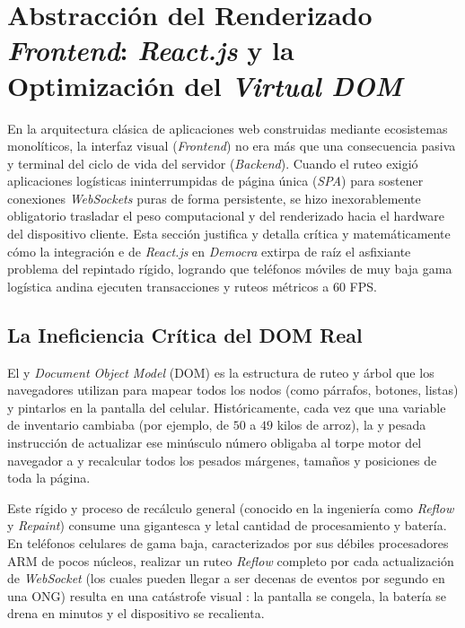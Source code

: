 \section{Abstracción del Renderizado \textit{Frontend}: \textit{React.js} y la Optimización del \textit{Virtual DOM}}

En la arquitectura clásica de aplicaciones web construidas mediante ecosistemas monolíticos, la interfaz visual (\textit{Frontend}) no era más que una consecuencia pasiva y terminal del ciclo de vida del servidor (\textit{Backend}). Cuando el ruteo exigió aplicaciones logísticas ininterrumpidas de página única (\textit{SPA}) para sostener conexiones \textit{WebSockets} puras de forma persistente, se hizo inexorablemente obligatorio trasladar el peso computacional y del renderizado hacia el hardware del dispositivo cliente. Esta sección justifica y detalla crítica y matemáticamente cómo la integración e de \textit{React.js} en \textit{Democra} extirpa de raíz el asfixiante problema del repintado rígido, logrando que teléfonos móviles de muy baja gama logística andina ejecuten transacciones y ruteos métricos a $60$ FPS.

\subsection{La Ineficiencia Crítica del DOM Real}

El y \textit{Document Object Model} (DOM) es la estructura de ruteo y árbol que los navegadores utilizan para mapear todos los nodos (como párrafos, botones, listas) y pintarlos en la pantalla del celular. Históricamente, cada vez que una variable de inventario cambiaba (por ejemplo, de $50$ a $49$ kilos de arroz), la y pesada instrucción de actualizar ese minúsculo número obligaba al torpe motor del navegador a y recalcular todos los pesados márgenes, tamaños y posiciones de toda la página.

Este rígido y proceso de recálculo general (conocido en la ingeniería como \textit{Reflow} y \textit{Repaint}) consume una gigantesca y letal cantidad de procesamiento y batería. En teléfonos celulares de gama baja, caracterizados por sus débiles procesadores ARM de pocos núcleos, realizar un ruteo \textit{Reflow} completo por cada actualización de \textit{WebSocket} (los cuales pueden llegar a ser decenas de eventos por segundo en una ONG) resulta en una catástrofe visual : la pantalla se congela, la batería se drena en minutos y el dispositivo se recalienta.

